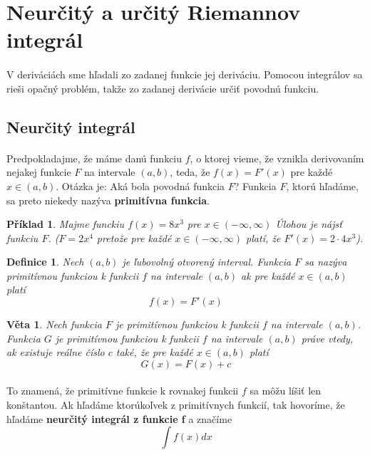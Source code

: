 \documentclass[12pt,a4paper]{article}
\newtheorem{definition}{Definice}
\newtheorem{sentence}{Věta}
\newtheorem{example}{Příklad}
\begin{document}
\section{Neurčitý a určitý Riemannov integrál}
\paragraph{}
V deriváciách sme hľadali zo zadanej funkcie jej deriváciu. Pomocou integrálov sa rieši opačný problém, takže zo zadanej derivácie určiť povodnú funkciu.

\subsection{Neurčitý integrál}
\paragraph{}
Predpokladajme, že máme danú funkciu $f$, o ktorej vieme, že vznikla derivovaním nejakej funkcie $F$ na intervale $(a, b)$, teda, že $f(x) =F'(x)$ pre každé $x \in (a, b)$. Otázka je: Aká bola povodná funkcia $F$? Funkcia $F$, ktorú hľadáme, sa preto niekedy nazýva \textbf{primitívna funkcia}.

\begin{example}
	Majme funckiu $f(x)=8x^{3}$ pre $x\in (-\infty , \infty)$ Úlohou je nájsť funkciu $F$. ($F=2x^{4}$ pretože pre každé $x\in (-\infty , \infty)$ platí, že $F'(x)=2\cdot 4x^{3}$). 
\end{example}

\begin{definition}
	Nech $(a, b)$ je ľubovolný otvorený interval. Funkcia $F$ sa nazýva primitívnou funkciou k funkcii $f$ na intervale $(a, b)$ ak pre každé $x \in (a, b)$ platí$$f(x)=F'(x)$$
\end{definition}

\begin{sentence}
	Nech funkcia $F$ je primitívnou funkciou k funkcii $f$ na intervale $(a, b)$. Funkcia $G$ je primitívnou funkciou k funkcii $f$ na intervale $(a, b)$ práve vtedy, ak existuje reálne číslo $c$ také, že pre každé $x\in (a, b)$ platí $$G(x)=F(x)+c$$
\end{sentence}

\paragraph{}
To znamená, že primitívne funkcie k rovnakej funkcii $f$ sa môžu líšiť len konštantou. Ak hľadáme ktorúkoľvek z primitívnych funkcií, tak hovoríme, že hľadáme \textbf{neurčitý integrál z funkcie f} a značíme $$\int f(x)dx$$
\end{document}

